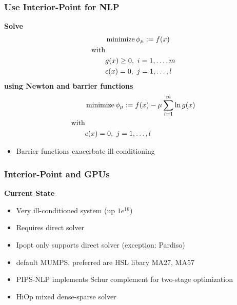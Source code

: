 \begin{frame}[fragile]
  \frametitle{Use Interior-Point for NLP}
  {\bf Solve}
  \begin{align*}
  &\minimize \phi_\mu := f(x)\\ 
  \text{with}&\\
  &g(x) \geq 0, \ i=1,\dots, m \\
  &c(x) = 0, \ j=1,\dots, l \\
  \end{align*}
  {\bf using Newton and barrier functions}
  \begin{align*}
  &\minimize \phi_\mu := f(x) - \mu \sum^m_{i=1} \ln g(x)\\ 
  \text{with}&\\
  &c(x) = 0, \ j=1,\dots, l 
  \end{align*}
  \begin{itemize}
    \item Barrier functions exacerbate ill-conditioning
  \end{itemize}
\end{frame}

\begin{frame}[fragile]
  \frametitle{Interior-Point and GPUs}
  {\bf Current State}
  \begin{itemize}
    \item Very ill-conditioned system (up $1e^16$)
    \item Requires direct solver
    \item Ipopt only supports direct solver (exception: Pardiso)
    \item default MUMPS, preferred are HSL libary MA27, MA57 
    \item PIPS-NLP implements Schur complement for two-stage optimization
    \item HiOp mixed dense-sparse solver 
  \end{itemize}
\end{frame}


